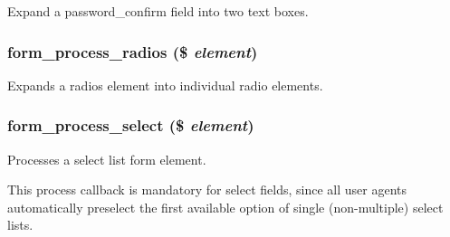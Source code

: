\label{group__form__api_gae3a3dcd1a5e4e44c5c03bb1426066596}
Expand a password\_\-confirm field into two text boxes. \hypertarget{group__form__api_ga61392e82fbc6eeeaf967b864da098ebc}{
\subsubsection[{form\_\-process\_\-radios}]{\setlength{\rightskip}{0pt plus 5cm}form\_\-process\_\-radios (\$ {\em element})}}
\label{group__form__api_ga61392e82fbc6eeeaf967b864da098ebc}
Expands a radios element into individual radio elements. \hypertarget{group__form__api_ga1a2156b4aa18f567264d8c7aafd85dca}{
\subsubsection[{form\_\-process\_\-select}]{\setlength{\rightskip}{0pt plus 5cm}form\_\-process\_\-select (\$ {\em element})}}
\label{group__form__api_ga1a2156b4aa18f567264d8c7aafd85dca}
Processes a select list form element.

This process callback is mandatory for select fields, since all user agents automatically preselect the first available option of single (non-\/multiple) select lists.


